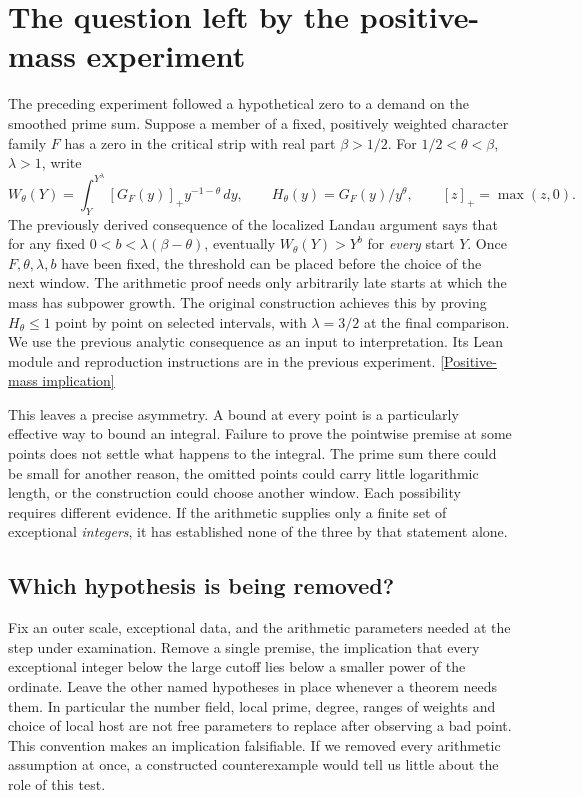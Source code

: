 \documentclass[12pt,letterpaper]{article}
\begin{document}
\section{The question left by the positive-mass experiment}
The preceding experiment followed a hypothetical zero to a demand on the smoothed prime sum. Suppose a member of a fixed, positively weighted character family \(F\) has a zero in the critical strip with real part \(\beta>1/2\). For \(1/2<\theta<\beta\), \(\lambda>1\), write
\begin{equation}
 W_\theta(Y)=\int_Y^{Y^\lambda}[G_F(y)]_+y^{-1-\theta}\,dy,\qquad
 H_\theta(y)=G_F(y)/y^\theta,\qquad [z]_+=\max(z,0).
 \label{eq:baseline}
\end{equation}
The previously derived consequence of the localized Landau argument says that for any fixed \(0<b<\lambda(\beta-\theta)\), eventually \(W_\theta(Y)>Y^b\) for \emph{every} start \(Y\). Once \(F,\theta,\lambda,b\) have been fixed, the threshold can be placed before the choice of the next window. The arithmetic proof needs only arbitrarily late starts at which the mass has subpower growth. The original construction achieves this by proving \(H_\theta\le1\) point by point on selected intervals, with \(\lambda=3/2\) at the final comparison. We use the previous analytic consequence as an input to interpretation. Its Lean module and reproduction instructions are in the previous experiment. \href{https://github.com/nousentllc/riemann-hypothesis/blob/b7b5bc6e5e6814f654753fcbd5f45fecf370344c/research/uriel/experiments/zero-and-arithmetic-windows/evidence/analytic/WindowMass.lean}{[Positive-mass implication]}

This leaves a precise asymmetry. A bound at every point is a particularly effective way to bound an integral. Failure to prove the pointwise premise at some points does not settle what happens to the integral. The prime sum there could be small for another reason, the omitted points could carry little logarithmic length, or the construction could choose another window. Each possibility requires different evidence. If the arithmetic supplies only a finite set of exceptional \emph{integers}, it has established none of the three by that statement alone.

\subsection{Which hypothesis is being removed?}
Fix an outer scale, exceptional data, and the arithmetic parameters needed at the step under examination. Remove a single premise, the implication that every exceptional integer below the large cutoff lies below a smaller power of the ordinate. Leave the other named hypotheses in place whenever a theorem needs them. In particular the number field, local prime, degree, ranges of weights and choice of local host are not free parameters to replace after observing a bad point. This convention makes an implication falsifiable. If we removed every arithmetic assumption at once, a constructed counterexample would tell us little about the role of this test.
\end{document}
